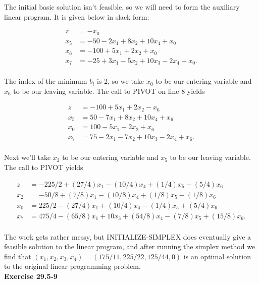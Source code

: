 \documentclass{article}
\begin{document}
The initial basic solution isn't feasible, so we will need to form the auxiliary linear program.  It is given below in slack form:

\begin{align*}
z &=-x_0 \\
x_5 &=-50 - 2x_1 + 8x_2 + 10x_4 + x_0  \\
x_6 &= -100 + 5x_1 + 2x_2 + x_0\\
x_7 &= -25 + 3x_1 - 5x_2 + 10x_3 - 2x_4 + x_0.\\
\end{align*}

The index of the minimum $b_i$ is 2, so we take $x_0$ to be our entering variable and $x_6$ to be our leaving variable.  The call to PIVOT on line 8 yields

\begin{align*}
z &=  -100 + 5x_1 + 2x_2 - x_6 \\
x_5 &=50 - 7x_1 + 8x_2 + 10x_4 + x_6  \\
x_0 &= 100 - 5x_1 - 2x_2 + x_6\\
x_7 &= 75 - 2x_1 - 7x_2 + 10x_3 - 2x_4 + x_6.\\
\end{align*}

Next we'll take $x_2$ to be our entering variable and $x_5$ to be our leaving variable.  The call to PIVOT yields

\begin{align*}
z &=  -225/2 + (27/4)x_1 - (10/4)x_4 + (1/4)x_5 - (5/4)x_6 \\
x_2 &= -50/8 + (7/8)x_1 - (10/8)x_4 + (1/8)x_5 - (1/8)x_6  \\
x_0 &= 225/2 - (27/4)x_1 + (10/4)x_4 - (1/4)x_5 + (5/4)x_6\\
x_7 &= 475/4 - (65/8)x_1 + 10x_3 + (54/8)x_4 - (7/8)x_5 + (15/8)x_6.\\
\end{align*}

The work gets rather messy, but INITIALIZE-SIMPLEX does eventually give a feasible solution to the linear program, and after running the simplex method we find that $(x_1,x_2,x_3,x_4) = (175/11,225/22,125/44,0)$ is an optimal solution to the original linear programming problem.  \\

\noindent\textbf{Exercise 29.5-9}\\
\end{document}
